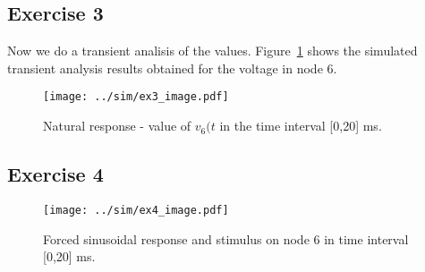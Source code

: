 \subsection{Exercise 3}

Now we do a transient analisis of the values. Figure~\ref{fig:Ex3_Image} shows the simulated transient analysis results obtained for the voltage in node 6.

\begin{figure}[H]
  \centering
  \texttt{[image: ../sim/ex3\_image.pdf]}
  \caption{Natural response - value of $v_6(t$ in the time interval [0,20] ms.}
  \label{fig:Ex3_Image}
\end{figure}

\subsection{Exercise 4}

\begin{figure}[H]
  \centering
  \texttt{[image: ../sim/ex4\_image.pdf]}
  \caption{Forced sinusoidal response and stimulus on node 6 in time interval [0,20] ms.}
  \label{fig:Ex4_Image}
\end{figure}
